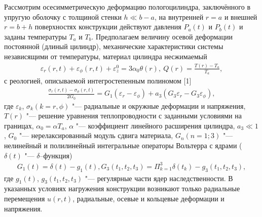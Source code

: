 \vzmscaption

Рассмотрим осесимметрическую деформацию полого цилиндра, заключённого в упругую оболочку с толщиной стенки $h \ll b-a$,
на внутренней $r=a$ и внешней $r=b+h$ поверхностях конструкции действуют давления $P_a(t)$ и $P_b(t)$ и заданы температуры $T_a$ и $T_b$.
Предполагаем величину осевой деформации постоянной (длиный цилиндр), механические характеристики системы независящими от температуры, материал цилиндра несжимаемый
\begin{equation}\label{eq:1}
    \begin{gathered}
        \varepsilon_r(r,t)+\varepsilon_\phi(r,t)+\varepsilon^0_z=3\alpha_0 \theta(r), \ Q(r)=\frac{T(r)-T_a}{T_a},
    \end{gathered}
\end{equation}
\noindent с реологией, описываемой интегростепенным полиномом [1]
\begin{equation}\label{eq:2}
    \begin{gathered}
        \frac{\sigma_r(r,t)-\sigma_\phi(r,t)}{2G_0}=G_1(\varepsilon_r-\varepsilon_\phi)+a_3(G_3\varepsilon_r-G_3\varepsilon_\phi),
    \end{gathered}
\end{equation}
\noindent где $\varepsilon_k$, $\sigma_k(k=r,\phi)$ "--- радиальные и окружные деформации и напряжения,
$T(r) $ "--- решение уравнения теплопроводности с заданными условиями на границах,
$\alpha_0=\alpha T_a$, $\alpha$ "--- коэффициент линейного расширения цилиндра, $a_3 \ll 1$,
$G_0$ "--- нерелаксированный модуль сдвига материала, $G_n(n=1;3)$ "--- нелинейный и полилинейный интегральные операторы Вольтерра с ядрами ($\delta(t)$ "--- $\delta$--функция)
\begin{equation}\label{eq:3}
    \begin{gathered}
        G_1(t)=\delta(t)-g_1(t), G_3(t_1,t_2,t_3)=\Pi^3_{k=1} \delta(t_k)-g_3(t_1,t_2,t_3),
    \end{gathered}
\end{equation}
\noindent где $g_1(t)$, $g_3(t_1,t_2,t_3)$ "--- регулярные части ядер наследственности.
В указанных условиях нагружения конструкции возникают только радиальные перемещения $u(r,t)$, радиальные, осевые и кольцевые деформации и напряжения.

